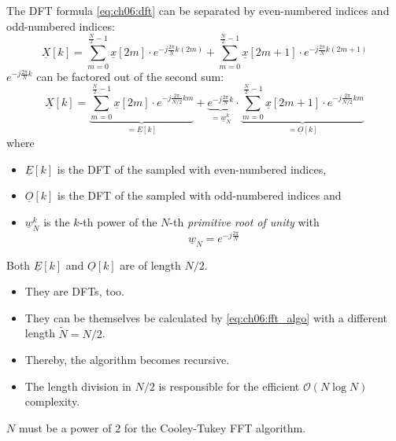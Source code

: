 \begin{refsection}
The \ac{DFT} formula \eqref{eq:ch06:dft} can be separated by even-numbered indices and odd-numbered indices:
\begin{equation}
	\underline{X}[k] = \sum\limits_{m = 0}^{\frac{N}{2} - 1} \underline{x}[2m] \cdot e^{- j \frac{2 \pi}{N} k \left(2m\right)} + \sum\limits_{m = 0}^{\frac{N}{2} - 1} \underline{x}[2m+1] \cdot e^{- j \frac{2 \pi}{N} k \left(2m+1\right)}
\end{equation}
$e^{- j \frac{2 \pi}{N} k}$ can be factored out of the second sum:
\begin{equation}
	\underline{X}[k] = \underbrace{\sum\limits_{m = 0}^{\frac{N}{2} - 1} \underline{x}[2m] \cdot e^{- j \frac{2 \pi}{N/2} k m}}_{= \underline{E}[k]} + \underbrace{e^{- j \frac{2 \pi}{N} k}}_{= \underline{w}_N^k} \cdot \underbrace{\sum\limits_{m = 0}^{\frac{N}{2} - 1} \underline{x}[2m+1] \cdot e^{- j \frac{2 \pi}{N/2} k m}}_{= \underline{O}[k]}
	\label{eq:ch06:fft_algo}
\end{equation}
where
\begin{itemize}
	\item $\underline{E}[k]$ is the \ac{DFT} of the sampled with even-numbered indices,
	\item $\underline{O}[k]$ is the \ac{DFT} of the sampled with odd-numbered indices and
	\item $\underline{w}_N^k$ is the $k$-th power of the $N$-th  \emph{primitive root of unity} with
	\begin{equation}
		\underline{w}_N = e^{- j \frac{2 \pi}{N}}
	\end{equation}
\end{itemize}

Both $\underline{E}[k]$ and $\underline{O}[k]$ are of length $N/2$.
\begin{itemize}
	\item They are \acp{DFT}, too.
	\item They can be themselves be calculated by \eqref{eq:ch06:fft_algo} with a different length $\tilde{N} = N/2$.
	\item Thereby, the algorithm becomes recursive.
	\item The length division in $N/2$ is responsible for the efficient $\mathcal{O}\left(N \log N\right)$ complexity.
\end{itemize}

\begin{fact}
	$N$ must be a power of $2$ for the Cooley-Tukey \acs{FFT} algorithm.
\end{fact}


\end{refsection}
